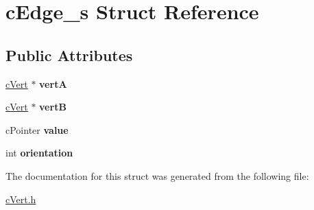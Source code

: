 \hypertarget{structcEdge__s}{}\section{c\+Edge\+\_\+s Struct Reference}
\label{structcEdge__s}
\subsection*{Public Attributes}
\begin{DoxyCompactItemize}
\item 
\mbox{\label{structcEdge__s_a358ee1b08a2a66f3e49eddafe6a61d48}} 
\mbox{\hyperlink{structcVert__s}{c\+Vert}} $\ast$ {\bfseries vertA}
\item 
\mbox{\label{structcEdge__s_aafa6690edd08f5049b383fd9e4200a38}} 
\mbox{\hyperlink{structcVert__s}{c\+Vert}} $\ast$ {\bfseries vertB}
\item 
\mbox{\label{structcEdge__s_afd662b6b926997e73b9889a7c00706fb}} 
c\+Pointer {\bfseries value}
\item 
\mbox{\label{structcEdge__s_a44ff32e4483c6a09a74b468ee7ad0601}} 
int {\bfseries orientation}
\end{DoxyCompactItemize}


The documentation for this struct was generated from the following file\+:\begin{DoxyCompactItemize}
\item 
\mbox{\hyperlink{cVert_8h}{c\+Vert.\+h}}\end{DoxyCompactItemize}
